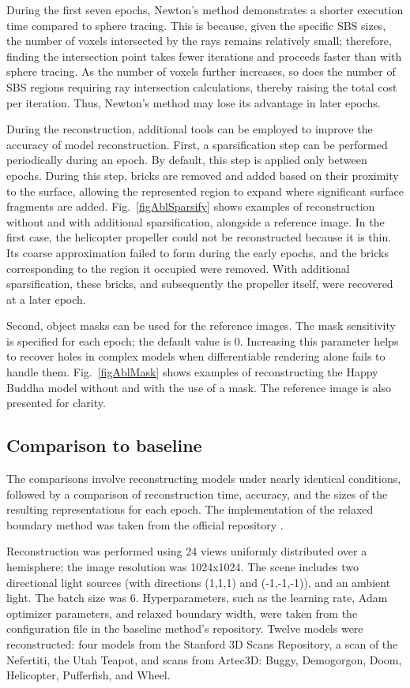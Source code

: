 \documentclass{ieeeaccess}
\begin{document}
During the first seven epochs, Newton's method demonstrates a shorter execution time compared to sphere tracing. This is because, given the specific SBS sizes, the number of voxels intersected by the rays remains relatively small; therefore, finding the intersection point takes fewer iterations and proceeds faster than with sphere tracing. As the number of voxels further increases, so does the number of SBS regions requiring ray intersection calculations, thereby raising the total cost per iteration. Thus, Newton's method may lose its advantage in later epochs.

During the reconstruction, additional tools can be employed to improve the accuracy of model reconstruction. First, 
a sparsification step can be performed periodically during an epoch. By default, this step is applied only between epochs. During this step, bricks are removed and added based on their proximity to the surface, allowing the represented region to expand where significant surface fragments are added. Fig.~\ref{figAblSparsify} shows examples of reconstruction without and with additional sparsification, alongside a reference image. In the first case, the helicopter propeller could not be reconstructed because it is thin. Its coarse approximation failed to form during the early epochs, and the bricks corresponding to the region it occupied were removed. With additional sparsification, these bricks, and subsequently the propeller itself, were recovered at a later epoch.

Second, object masks can be used for the reference images. The mask sensitivity is specified for each epoch; the default value is 0. Increasing this parameter helps to recover holes in complex models when differentiable rendering alone fails to handle them. Fig.~\ref{figAblMask} shows examples of reconstructing the Happy Buddha model without and with the use of a mask. The reference image is also presented for clarity.

\subsection{Comparison to baseline}

The comparisons involve reconstructing models under nearly identical conditions, followed by a comparison of reconstruction time, accuracy, and the sizes of the resulting representations for each epoch. The implementation of the relaxed boundary method was taken from the official repository \cite{RelaxRepo}.

Reconstruction was performed using 24 views uniformly distributed over a hemisphere; the image resolution was 1024x1024. The scene includes two directional light sources (with directions (1,1,1) and (-1,-1,-1)), and an ambient light. The batch size was 6. Hyperparameters, such as the learning rate, Adam optimizer parameters, and relaxed boundary width, were taken from the configuration file in the baseline method's repository. Twelve models were reconstructed: four models from the Stanford 3D Scans Repository, a scan of the Nefertiti, the Utah Teapot, and scans from Artec3D: Buggy, Demogorgon, Doom, Helicopter, Pufferfish, and Wheel.
\end{document}
